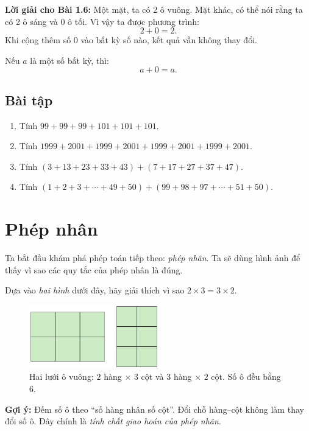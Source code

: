 \noindent\textbf{Lời giải cho Bài 1.6:}  
Một mặt, ta có 2 ô vuông.  
Mặt khác, có thể nói rằng ta có 2 ô sáng và 0 ô tối.  
Vì vậy ta được phương trình:
\[
2 + 0 = 2.
\]
Khi cộng thêm số 0 vào bất kỳ số nào, kết quả vẫn không thay đổi.

\begin{tcolorbox}[colback=yellow!10!white, colframe=orange!80!black,
title={Tính chất cộng với số không}]
Nếu \(a\) là một số bất kỳ, thì:
\[
a + 0 = a.
\]
\end{tcolorbox}

\subsection*{Bài tập}
\begin{enumerate}[label=1.2.\arabic*.]
  \item Tính \(99+99+99+101+101+101\).
  \item Tính \(1999+2001+1999+2001+1999+2001+1999+2001\).
  \item Tính \((3+13+23+33+43)+(7+17+27+37+47)\).
  \item Tính \((1+2+3+\cdots+49+50)+(99+98+97+\cdots+51+50)\).
\end{enumerate}

\section{Phép nhân}

\noindent Ta bắt đầu khám phá phép toán tiếp theo: \emph{phép nhân}.
Ta sẽ dùng hình ảnh để thấy vì sao các quy tắc của phép nhân là đúng.

\begin{problem}[1.7]
Dựa vào \emph{hai hình} dưới đây, hãy giải thích vì sao \(2\times3=3\times2\).

\begin{figure}[ht!]
  \centering
  \includegraphics[width=0.50\textwidth]{img/fig-prob1.7.pdf}
  \caption*{\small Hai lưới ô vuông: \(2\) hàng \(\times\) \(3\) cột và \(3\) hàng \(\times\) \(2\) cột.
  Số ô đều bằng \(6\).}
\end{figure}

\textbf{Gợi ý:} Đếm số ô theo “số hàng nhân số cột”. Đổi chỗ hàng–cột
không làm thay đổi số ô. Đây chính là \emph{tính chất giao hoán của phép nhân}.
\end{problem}

